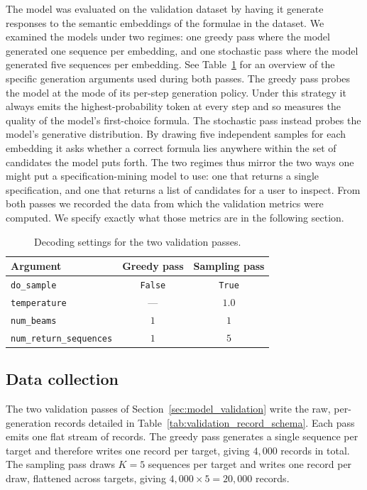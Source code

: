 \documentclass[titlepage,a4paper,11pt]{report}
\begin{document}
    The model was evaluated on the validation dataset by having it generate responses to the semantic embeddings of the formulae in the dataset. We examined the models under two regimes: one greedy pass where the model generated one sequence per embedding, and one stochastic pass where the model generated five sequences per embedding. See Table~\ref{tab:validation_generation_settings} for an overview of the specific generation arguments used during both passes. The greedy pass probes the model at the mode of its per-step generation policy. Under this strategy it always emits the highest-probability token at every step and so measures the quality of the model's first-choice formula. The stochastic pass instead probes the model's generative distribution. By drawing five independent samples for each embedding it asks whether a correct formula lies anywhere within the set of candidates the model puts forth. The two regimes thus mirror the two ways one might put a specification-mining model to use: one that returns a single specification, and one that returns a list of candidates for a user to inspect. From both passes we recorded the data from which the validation metrics were computed. We specify exactly what those metrics are in the following section. 
    
    \begin{table}[ht]
        \centering
        \caption{Decoding settings for the two validation passes.}
        \label{tab:validation_generation_settings}
        \begin{tabular}{lcc}
            \toprule
            Argument & Greedy pass & Sampling pass \\
            \midrule
            \texttt{do\_sample}             & \texttt{False}    & \texttt{True} \\
            \texttt{temperature}            & ---               & $1.0$ \\
            \texttt{num\_beams}             & $1$               & $1$ \\
            \texttt{num\_return\_sequences} & $1$               & $5$ \\
            \bottomrule
        \end{tabular}
    \end{table}
    
    \subsection{Data collection}\label{sec:data_collection}
    The two validation passes of Section~\ref{sec:model_validation} write the raw, per-generation records detailed in Table~\ref{tab:validation_record_schema}. Each pass emits one flat stream of records. The greedy pass generates a single sequence per target and therefore writes one record per target, giving $4{,}000$ records in total. The sampling pass draws $K = 5$ sequences per target and writes one record per draw, flattened across targets, giving $4{,}000 \times 5 = 20{,}000$ records.
\end{document}
